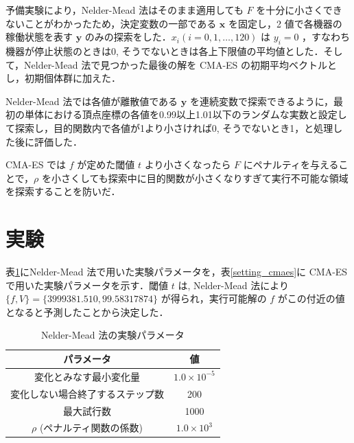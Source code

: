 \documentclass[twocolumn]{jarticle}
\begin{document}
予備実験により，Nelder-Mead 法はそのまま適用しても $F$ を十分に小さくできないことがわかったため，決定変数の一部である $\bm{x}$ を固定し，2 値で各機器の稼働状態を表す $\bm{y}$ のみの探索をした．$x_i(i=0,1,\dots,120)$ は $y_i=0$ ，すなわち機器が停止状態のときは0, そうでないときは各上下限値の平均値とした．そして，Nelder-Mead 法で見つかった最後の解を CMA-ES の初期平均ベクトルとし，初期個体群に加えた．

Nelder-Mead 法では各値が離散値である $\bm{y}$ を連続変数で探索できるように，最初の単体における頂点座標の各値を0.99以上1.01以下のランダムな実数と設定して探索し，目的関数内で各値が1より小さければ0, そうでないとき1，と処理した後に評価した．

CMA-ES では $f$ が定めた閾値 $t$ より小さくなったら $F$ にペナルティを与えることで，$\rho$ を小さくしても探索中に目的関数が小さくなりすぎて実行不可能な領域を探索することを防いだ．

\section{実験}
表\ref{setting_nelder}にNelder-Mead 法で用いた実験パラメータを，表\ref{setting_cmaes}に CMA-ES で用いた実験パラメータを示す．閾値 $t$ は, Nelder-Mead 法により $\{f, V\}=\{3999381.510, 99.58317874\}$ が得られ，実行可能解の $f$ がこの付近の値となると予測したことから決定した．
\begin{table}[htbp]
    \begin{center}
        \caption{Nelder-Mead 法の実験パラメータ}
        \label{setting_nelder}
        \begin{tabular}{| c | c |} 
            \hline
            パラメータ & 値 \\ 
            \hline
            変化とみなす最小変化量 & $1.0\times10^{-5}$ \\
            変化しない場合終了するステップ数 & 200 \\
            最大試行数 & 1000 \\
            $\rho$ (ペナルティ関数の係数) & $1.0\times10^{3}$\\ 
            \hline
        \end{tabular}
    \end{center}
\end{table}
\end{document}
